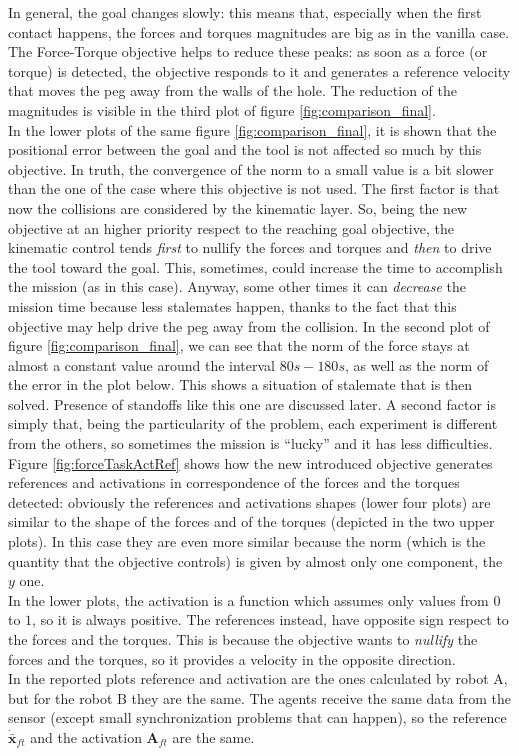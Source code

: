 In general, the goal changes slowly: this means that, especially when the first contact happens, the forces and torques magnitudes are big as in the vanilla case. The Force-Torque objective helps to reduce these peaks: as soon as a force (or torque) is detected, the objective responds to it and generates a reference velocity that moves the peg away from the walls of the hole. The reduction of the magnitudes is visible in the third plot of figure \ref{fig:comparison_final}. \\
In the lower plots of the same figure \ref{fig:comparison_final}, it is shown that the positional error between the goal and the tool is not affected so much by this objective. In truth, the convergence of the norm to a small value is a bit slower than the one of the case where this objective is not used. The first factor is that now the collisions are considered by the kinematic layer. So, being the new objective at an higher priority respect to the reaching goal objective, the kinematic control tends \textit{first} to nullify the forces and torques and \textit{then} to drive the tool toward the goal. This, sometimes, could increase the time to accomplish the mission (as in this case). Anyway, some other times it can \textit{decrease} the mission time because less stalemates happen, thanks to the fact that this objective may help drive the peg away from the collision. In the second plot of figure \ref{fig:comparison_final}, we can see that the norm of the force stays at almost a constant value around the interval $80s-180s$, as well as the norm of the error in the plot below. This shows a situation of stalemate that is then solved. Presence of standoffs like this one are discussed later. A second factor is simply that, being the particularity of the problem, each experiment is different from the others, so sometimes the mission is \enquote{lucky} and it has less difficulties.\\
Figure \ref{fig:forceTaskActRef} shows how the new introduced objective generates references and activations in correspondence of the forces and the torques detected: obviously the references and activations shapes (lower four plots) are similar to the shape of the forces and of the torques (depicted in the two upper plots). In this case they are even more similar because the norm (which is the quantity that the objective controls) is given by almost only one component, the $y$ one.\\ 
In the lower plots, the activation is a function which assumes only values from $0$ to $1$, so it is always positive. The references instead, have opposite sign respect to the forces and the torques. This is because the objective wants to \textit{nullify} the forces and the torques, so it provides a velocity in the opposite direction.\\ 
In the reported plots reference and activation are the ones calculated by robot A, but for the robot B they are the same. The agents receive the same data from the sensor (except small synchronization problems that can happen), so the reference $\dot{\bar{\boldsymbol{x}}}_{ft}$ and the activation 	$\boldsymbol{A}_{ft}$ are the same.\\

